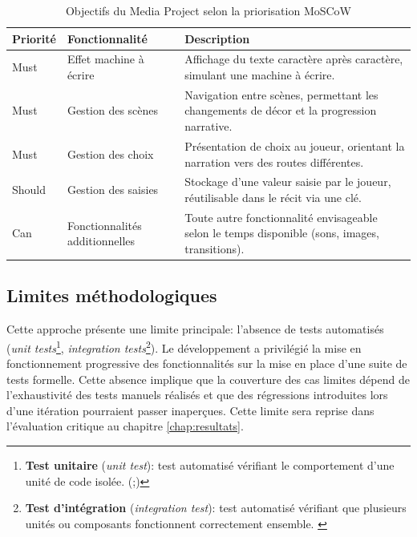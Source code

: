 \begin{table}[H]
    \centering
    \caption{Objectifs du Media Project selon la priorisation MoSCoW}
    \renewcommand{\arraystretch}{1.5}
    \begin{tabular}{p{2cm} p{4.5cm} p{6cm}}
        \hline
        \textbf{Priorité} & \textbf{Fonctionnalité} & \textbf{Description} \\
        \hline
        Must & Effet machine à écrire & Affichage du texte caractère après caractère, simulant une machine à écrire. \\
        \addlinespace
        Must & Gestion des scènes & Navigation entre scènes, permettant les changements de décor et la progression narrative. \\
        \addlinespace
        Must & Gestion des choix & Présentation de choix au joueur, orientant la narration vers des routes différentes. \\
        \addlinespace
        Should & Gestion des saisies & Stockage d'une valeur saisie par le joueur, réutilisable dans le récit via une clé. \\
        \addlinespace
        Can & Fonctionnalités additionnelles & Toute autre fonctionnalité envisageable selon le temps disponible (sons, images, transitions). \\
        \hline
    \end{tabular}
    \label{tab:objectifs_moscow}
\end{table}

\clearpage


\subsection{Limites méthodologiques}

Cette approche présente une limite principale: l'absence de tests automatisés (\textit{unit tests}\footnote{\textbf{Test unitaire} (\textit{unit test}): test automatisé vérifiant le comportement d'une unité de code isolée. (\cite{beck_test-driven_2002};\cite{aniche_effective_2022})}, \textit{integration tests}\footnote{\textbf{Test d'intégration} (\textit{integration test}): test automatisé vérifiant que plusieurs unités ou composants fonctionnent correctement ensemble. \parencite{aniche_effective_2022}}). Le développement a privilégié la mise en fonctionnement progressive des fonctionnalités sur la mise en place d'une suite de tests formelle. Cette absence implique que la couverture des cas limites dépend de l'exhaustivité des tests manuels réalisés et que des régressions introduites lors d'une itération pourraient passer inaperçues. Cette limite sera reprise dans l'évaluation critique au chapitre \ref{chap:resultats}.